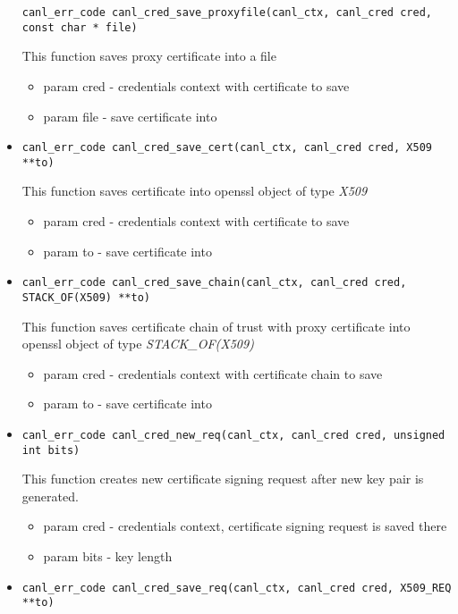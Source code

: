\begin{itemize}
\begin{verbatim}
canl_err_code canl_cred_save_proxyfile(canl_ctx, canl_cred cred,
const char * file)\end{verbatim}
  This function saves proxy certificate into a file
  \begin{itemize}
    \item param cred - credentials context with certificate to save 
    \item param file - save certificate into 
  \end{itemize}
  \item \begin{verbatim}
canl_err_code canl_cred_save_cert(canl_ctx, canl_cred cred, X509 **to)\end{verbatim}
  This function saves certificate into openssl object of type \textit{X509}
  \begin{itemize}
    \item param cred - credentials context with certificate to save
    \item param to - save certificate into
  \end{itemize}
  \item \begin{verbatim}
canl_err_code canl_cred_save_chain(canl_ctx, canl_cred cred, STACK_OF(X509) **to)\end{verbatim}
  This function saves certificate chain of trust with proxy 
  certificate into openssl object of type \textit{STACK\_OF(X509)}
  \begin{itemize}
   \item param cred - credentials context with certificate chain to save
    \item param to - save certificate into
  \end{itemize}
  \item \begin{verbatim}
canl_err_code canl_cred_new_req(canl_ctx, canl_cred cred, unsigned int bits)\end{verbatim}
  This function creates new certificate signing request after new key pair 
  is generated.
   \begin{itemize}
    \item param cred - credentials context, certificate signing request 
    is saved there
    \item param bits - key length
  \end{itemize}
  \item \begin{verbatim}
canl_err_code canl_cred_save_req(canl_ctx, canl_cred cred, X509_REQ **to)\end{verbatim}

\end{itemize}
